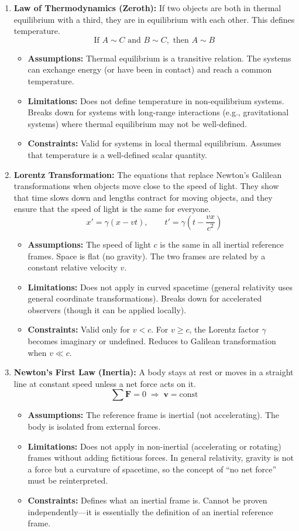 \begin{enumerate}
\item \textbf{Law of Thermodynamics (Zeroth):} If two objects are both in thermal equilibrium with a third, they are in equilibrium with each other. This defines temperature.
\[
\text{If }A\sim C\text{ and }B\sim C,\text{ then }A\sim B
\]
\begin{itemize}
\item \textbf{Assumptions:} Thermal equilibrium is a transitive relation. The systems can exchange energy (or have been in contact) and reach a common temperature.
\item \textbf{Limitations:} Does not define temperature in non-equilibrium systems. Breaks down for systems with long-range interactions (e.g., gravitational systems) where thermal equilibrium may not be well-defined.
\item \textbf{Constraints:} Valid for systems in local thermal equilibrium. Assumes that temperature is a well-defined scalar quantity.
\end{itemize}

\item \textbf{Lorentz Transformation:} The equations that replace Newton's Galilean transformations when objects move close to the speed of light. They show that time slows down and lengths contract for moving objects, and they ensure that the speed of light is the same for everyone.
\[
x'=\gamma(x-vt),\qquad
t'=\gamma\left(t-\frac{vx}{c^2}\right)
\]
\begin{itemize}
\item \textbf{Assumptions:} The speed of light $c$ is the same in all inertial reference frames. Space is flat (no gravity). The two frames are related by a constant relative velocity $v$.
\item \textbf{Limitations:} Does not apply in curved spacetime (general relativity uses general coordinate transformations). Breaks down for accelerated observers (though it can be applied locally).
\item \textbf{Constraints:} Valid only for $v<c$. For $v\geq c$, the Lorentz factor $\gamma$ becomes imaginary or undefined. Reduces to Galilean transformation when $v\ll c$.
\end{itemize}

\item \textbf{Newton's First Law (Inertia):} A body stays at rest or moves in a straight line at constant speed unless a net force acts on it.
\[
\sum\mathbf F=0 \;\Rightarrow\; \mathbf v=\text{const}
\]
\begin{itemize}
\item \textbf{Assumptions:} The reference frame is inertial (not accelerating). The body is isolated from external forces.
\item \textbf{Limitations:} Does not apply in non-inertial (accelerating or rotating) frames without adding fictitious forces. In general relativity, gravity is not a force but a curvature of spacetime, so the concept of ``no net force'' must be reinterpreted.
\item \textbf{Constraints:} Defines what an inertial frame is. Cannot be proven independently---it is essentially the definition of an inertial reference frame.
\end{itemize}


\end{enumerate}
